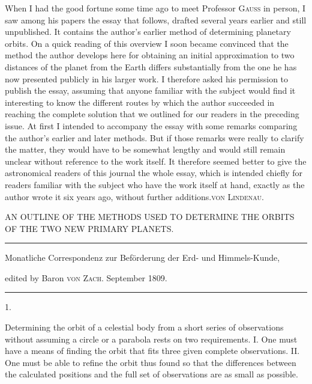 \expandafter\def\csname HistoricalNoteText8\endcsname{When I had the good fortune some time ago to meet Professor \textsc{Gauss} in person, I saw among his papers the essay that follows, drafted several years earlier and still unpublished. It contains the author’s earlier method of determining planetary orbits. On a quick reading of this overview I soon became convinced that the method the author develops here for obtaining an initial approximation to two distances of the planet from the Earth differs substantially from the one he has now presented publicly in his larger work. I therefore asked his permission to publish the essay, assuming that anyone familiar with the subject would find it interesting to know the different routes by which the author succeeded in reaching the complete solution that we outlined for our readers in the preceding issue. At first I intended to accompany the essay with some remarks comparing the author’s earlier and later methods. But if those remarks were really to clarify the matter, they would have to be somewhat lengthy and would still remain unclear without reference to the work itself. It therefore seemed better to give the astronomical readers of this journal the whole essay, which is intended chiefly for readers familiar with the subject who have the work itself at hand, exactly as the author wrote it six years ago, without further additions.\hfill\textsc{von Lindenau.}}
\clearpage{}%
\begin{center}
{\small AN OUTLINE OF THE METHODS USED TO DETERMINE THE ORBITS OF THE TWO NEW PRIMARY PLANETS.\par}
\medskip\hrule\medskip
{\small Monatliche Correspondenz zur Beförderung der Erd- und Himmels-Kunde,\par
edited by Baron \textsc{von Zach}. September 1809.\par}
\medskip\hrule
\end{center}\medskip
\begin{center}1.\end{center}
Determining the orbit of a celestial body from a short series of observations without assuming a circle or a parabola rests on two requirements. I. One must have a means of finding the orbit that fits three given complete observations. II. One must be able to refine the orbit thus found so that the differences between the calculated positions and the full set of observations are as small as possible.


